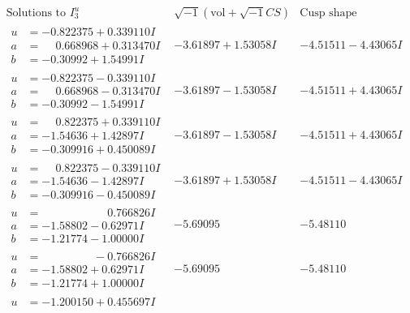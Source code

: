 \documentclass[1p]{elsarticle_modified}
\theoremstyle{definition}
\newcommand{\I}{\sqrt{-1}}
\begin{document}
$$\begin{array}{c|c|c}  
\text{Solutions to }I^u_{3}& \I (\text{vol} + \sqrt{-1}CS) & \text{Cusp shape}\\
 \hline 
\begin{aligned}
u &= -0.822375 + 0.339110 I \\
a &= \phantom{-}0.668968 + 0.313470 I \\
b &= -0.30992 + 1.54991 I\end{aligned}
 & -3.61897 + 1.53058 I & -4.51511 - 4.43065 I \\ \hline\begin{aligned}
u &= -0.822375 - 0.339110 I \\
a &= \phantom{-}0.668968 - 0.313470 I \\
b &= -0.30992 - 1.54991 I\end{aligned}
 & -3.61897 - 1.53058 I & -4.51511 + 4.43065 I \\ \hline\begin{aligned}
u &= \phantom{-}0.822375 + 0.339110 I \\
a &= -1.54636 + 1.42897 I \\
b &= -0.309916 + 0.450089 I\end{aligned}
 & -3.61897 - 1.53058 I & -4.51511 + 4.43065 I \\ \hline\begin{aligned}
u &= \phantom{-}0.822375 - 0.339110 I \\
a &= -1.54636 - 1.42897 I \\
b &= -0.309916 - 0.450089 I\end{aligned}
 & -3.61897 + 1.53058 I & -4.51511 - 4.43065 I \\ \hline\begin{aligned}
u &= \phantom{-0.000000 -}0.766826 I \\
a &= -1.58802 - 0.62971 I \\
b &= -1.21774 - 1.00000 I\end{aligned}
 & -5.69095\phantom{ +0.000000I} & -5.48110\phantom{ +0.000000I} \\ \hline\begin{aligned}
u &= \phantom{-0.000000 } -0.766826 I \\
a &= -1.58802 + 0.62971 I \\
b &= -1.21774 + 1.00000 I\end{aligned}
 & -5.69095\phantom{ +0.000000I} & -5.48110\phantom{ +0.000000I} \\ \hline\begin{aligned}
u &= -1.200150 + 0.455697 I \\

\end{aligned}
\end{array}$$
\end{document}
